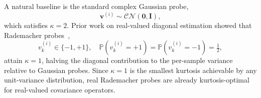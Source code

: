 \documentclass[AMA,STIX2COL,Linenumberson]{MRM}
\begin{document}
A natural baseline is the standard complex Gaussian probe,
\begin{equation}
\mathbf{v}^{(i)} \sim \mathcal{CN}(\mathbf{0}, \mathbf{I}),
\label{eq:gaussian_probe}
\end{equation}
which satisfies $\kappa = 2$. Prior work on real-valued diagonal estimation showed that Rademacher probes~\cite{hutchinson,bekas},
\begin{equation}
v^{(i)}_k \in \{-1, +1\}, \quad \mathbb{P}(v^{(i)}_k = +1) = \mathbb{P}(v^{(i)}_k = -1) = \tfrac{1}{2},
\label{eq:real_rademacher}
\end{equation}
attain $\kappa = 1$, halving the diagonal contribution to the per-sample variance relative to Gaussian probes. Since $\kappa = 1$ is the smallest kurtosis achievable by any unit-variance distribution, real Rademacher probes are already kurtosis-optimal for real-valued covariance operators.
\end{document}
